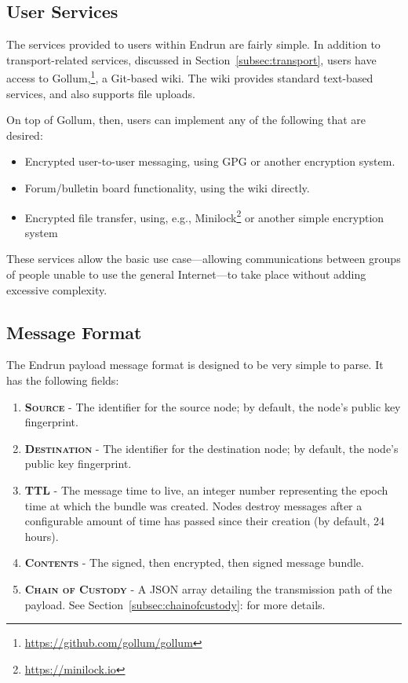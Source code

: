\documentclass[12pt]{article}
\begin{document}
  \subsection{User Services}
  
  The services provided to users within Endrun are fairly simple. In addition to transport-related services, discussed in Section~\ref{subsec:transport}, users have access to Gollum,\footnote{\url{https://github.com/gollum/gollum}}, a Git-based wiki. The wiki provides standard text-based services, and also supports file uploads.
  
  On top of Gollum, then, users can implement any of the following that are desired:
  \begin{itemize}
    \item Encrypted user-to-user messaging, using GPG or another encryption system.
    \item Forum/bulletin board functionality, using the wiki directly.
    \item Encrypted file transfer, using, e.g., Minilock\footnote{\url{https://minilock.io}} or another simple encryption system
  \end{itemize}
  
  These services allow the basic use case---allowing communications between groups of people unable to use the general Internet---to take place without adding excessive complexity.
  
  \subsection{Message Format}
  
  The Endrun payload message format is designed to be very simple to parse. It has the following fields:
  
  \begin{enumerate}
    \item \textbf{\textsc{Source}} - The identifier for the source node; by default, the node's public key fingerprint. 
    \item \textbf{\textsc{Destination}} - The identifier for the destination node; by default, the node's public key fingerprint.
    \item \textbf{\textsc{TTL}} - The message time to live, an integer number representing the epoch time at which the bundle was created. Nodes destroy messages after a configurable amount of time has passed since their creation (by default, 24 hours).
    \item \textbf{\textsc{Contents}} - The signed, then encrypted, then signed message bundle.
    \item \textbf{\textsc{Chain of Custody}} - A JSON array detailing the transmission path of the payload. See Section~\ref{subsec:chainofcustody}: for more details.

    \end{enumerate}
    
\end{document}
